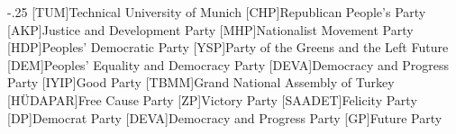 \documentclass[headsepline,footsepline,footinclude=false,oneside,fontsize=11pt,paper=a4,listof=totoc,bibliography=totoc]{scrbook} %
\begin{document}


\frontmatter{}





\tableofcontents{}

\mainmatter{}










\appendix{}


\begin{acronym}
	\itemsep-.25\baselineskip
	[TUM]{Technical University of Munich}
	[CHP]{Republican People's Party}
	[AKP]{Justice and Development Party}
	[MHP]{Nationalist Movement Party}
	[HDP]{Peoples' Democratic Party}
	[YSP]{Party of the Greens and the Left Future}
	[DEM]{Peoples' Equality and Democracy Party}
	[DEVA]{Democracy and Progress Party}
	[IYIP]{Good Party}
	[TBMM]{Grand National Assembly of Turkey}
	[HÜDAPAR]{Free Cause Party}
	[ZP]{Victory Party}
	[SAADET]{Felicity Party}
	[DP]{Democrat Party}
	[DEVA]{Democracy and Progress Party}
	[GP]{Future Party}
\end{acronym}

\listoffigures{}
\listoftables{}
\printbibliography{}
\end{document}
